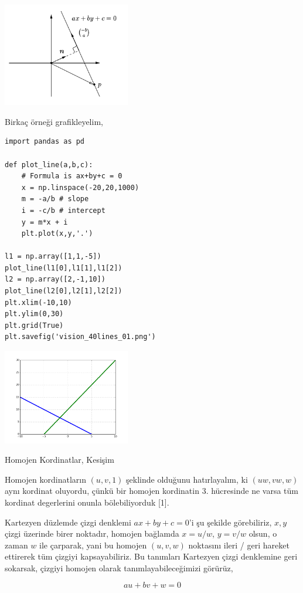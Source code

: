 \documentclass[12pt,fleqn]{article}\usepackage{../../common}
\begin{document}
\includegraphics[width=15em]{vision_40lines_06.png}

Birkaç örneği grafikleyelim,

\begin{verbatim}
import pandas as pd

def plot_line(a,b,c):
    # Formula is ax+by+c = 0 
    x = np.linspace(-20,20,1000)    
    m = -a/b # slope
    i = -c/b # intercept
    y = m*x + i
    plt.plot(x,y,'.')

l1 = np.array([1,1,-5])
plot_line(l1[0],l1[1],l1[2])
l2 = np.array([2,-1,10])
plot_line(l2[0],l2[1],l2[2])
plt.xlim(-10,10)
plt.ylim(0,30)
plt.grid(True)
plt.savefig('vision_40lines_01.png')
\end{verbatim}

\includegraphics[width=15em]{vision_40lines_01.png}

Homojen Kordinatlar, Kesişim

Homojen kordinatların $(u,v,1)$ şeklinde olduğunu hatırlayalım, ki
$(uw,vw, w)$ aynı kordinat oluyordu, çünkü bir homojen kordinatin
3. hücresinde ne varsa tüm kordinat degerlerini onunla bölebiliyorduk [1].

Kartezyen düzlemde çizgi denklemi $ax+by+c=0$'i şu şekilde görebiliriz,
$x,y$ çizgi üzerinde birer noktadır, homojen bağlamda $x=u/w$, $y=v/w$
olsun, o zaman $w$ ile çarparak, yani bu homojen $(u,v,w)$ noktasını ileri
/ geri hareket ettirerek tüm çizgiyi kapsayabiliriz. Bu tanımları Kartezyen
çizgi denklemine geri sokarsak, çizgiyi homojen olarak
tanımlayabileceğimizi görürüz,

$$ au + bv + w = 0$$
\end{document}
